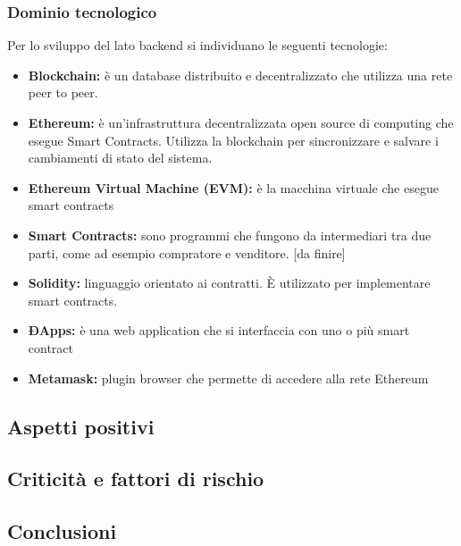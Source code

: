 \subsubsection{Dominio tecnologico}
Per lo sviluppo del lato backend si individuano le seguenti tecnologie:
\begin{itemize}
    \item \textbf{Blockchain: }è un database distribuito e 
    decentralizzato che utilizza una rete peer to peer.
	\item \textbf{Ethereum: }è un'infrastruttura decentralizzata open source di computing che
	esegue Smart Contracts. Utilizza la blockchain per sincronizzare e salvare i cambiamenti di stato
	del sistema.
	\item \textbf{Ethereum Virtual Machine (EVM): }è la macchina virtuale che esegue smart contracts
	\item \textbf{Smart Contracts: } sono programmi che fungono da intermediari tra due parti, come ad esempio
	compratore e venditore. [da finire]
	\item \textbf{Solidity: }linguaggio orientato ai contratti. \`E utilizzato per implementare smart contracts.
	\item \textbf{ÐApps: }è una web application che si interfaccia con uno o più smart contract
	\item \textbf{Metamask: }plugin browser che permette di accedere alla rete Ethereum

\end{itemize}

\subsection{Aspetti positivi}

\subsection{Criticità e fattori di rischio}

\subsection{Conclusioni}
